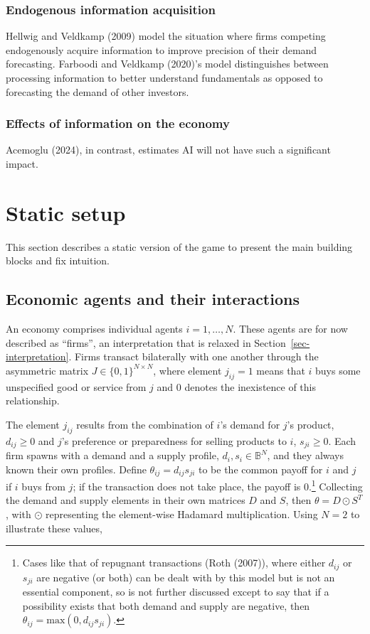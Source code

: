 \documentclass[
]{article}
\theoremstyle{definition}
\theoremstyle{plain}
\theoremstyle{remark}
\begin{document}
\subsubsection{Endogenous information
acquisition}\label{endogenous-information-acquisition}

Hellwig and Veldkamp (2009) model the situation where firms competing
endogenously acquire information to improve precision of their demand
forecasting. Farboodi and Veldkamp (2020)'s model distinguishes between
processing information to better understand fundamentals as opposed to
forecasting the demand of other investors.

\subsubsection{Effects of information on the
economy}\label{effects-of-information-on-the-economy}

Acemoglu (2024), in contrast, estimates AI will not have such a
significant impact.

\section{Static setup}\label{static-setup}

This section describes a static version of the game to present the main
building blocks and fix intuition.

\subsection{Economic agents and their
interactions}\label{economic-agents-and-their-interactions}

An economy comprises individual agents \(i = 1, \dots, N\). These agents
are for now described as ``firms'', an interpretation that is relaxed in
Section~\ref{sec-interpretation}. Firms transact bilaterally with one
another through the asymmetric matrix \(J \in \{0, 1\}^{N \times N}\),
where element \(j_{ij} = 1\) means that \(i\) buys some unspecified good
or service from \(j\) and \(0\) denotes the inexistence of this
relationship.

The element \(j_{ij}\) results from the combination of \(i\)'s demand
for \(j\)'s product, \(d_{ij} \geq 0\) and \(j\)'s preference or
preparedness for selling products to \(i\), \(s_{ji} \geq 0\). Each firm
spawns with a demand and a supply profile,
\(d_i, s_i \in \mathbb{B}^N\), and they always known their own profiles.
Define \(\theta_{ij} = d_{ij} s_{ji}\) to be the common payoff for \(i\)
and \(j\) if \(i\) buys from \(j\); if the transaction does not take
place, the payoff is \(0\).\footnote{Cases like that of repugnant
  transactions (Roth (2007)), where either \(d_{ij}\) or \(s_{ji}\) are
  negative (or both) can be dealt with by this model but is not an
  essential component, so is not further discussed except to say that if
  a possibility exists that both demand and supply are negative, then
  \(\theta_{ij} = \text{max}(0, d_{ij} s_{ji})\).} Collecting the demand
and supply elements in their own matrices \(D\) and \(S\), then
\(\theta = D \odot S^T\), with \(\odot\) representing the element-wise
Hadamard multiplication. Using \(N=2\) to illustrate these values,
\end{document}
